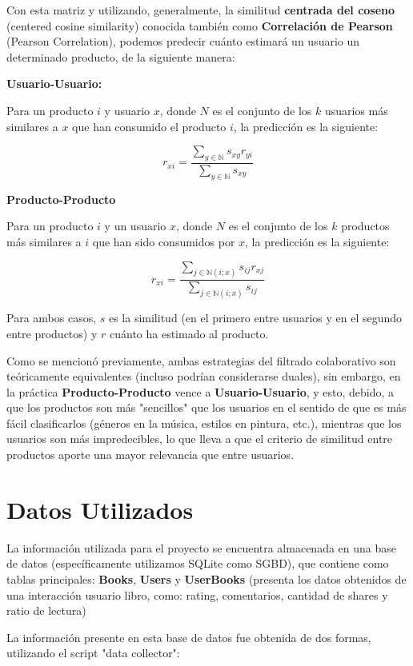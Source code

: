 \documentclass[14pt]{extarticle}
\begin{document}
Con esta matriz y utilizando, generalmente, la similitud \textbf{centrada del coseno} (centered cosine similarity) conocida también como \textbf{Correlación de Pearson} (Pearson Correlation), podemos predecir cuánto estimará un usuario un determinado producto, de la siguiente manera:

\textbf{Usuario-Usuario:}

Para un producto $i$ y usuario $x$, donde $N$ es el conjunto de los $k$ usuarios más similares a $x$ que han consumido el producto $i$, la predicción es la siguiente:

$$r_{xi} = \frac{\sum_{y \in \mathbb{N}} s_{xy} r_{yi}}{\sum_{y \in \mathbb{N}} s_{xy}}$$


\textbf{Producto-Producto}

Para un producto $i$ y un usuario $x$, donde $N$ es el conjunto de los $k$ productos más similares a $i$ que han sido consumidos por $x$, la predicción es la siguiente:

$$r_{xi} = \frac{\sum_{j \in \mathbb{N} (i; x)} s_{ij} r_{xj}}{\sum_{j \in \mathbb{N} (i;x)} s_{ij}}$$


Para ambos casos, $s$ es la similitud (en el primero entre usuarios y en el segundo entre productos) y $r$ cuánto ha estimado al producto.

Como se mencionó previamente, ambas estrategias del filtrado colaborativo son teóricamente equivalentes (incluso podrían considerarse duales), sin embargo, en la práctica \textbf{Producto-Producto} vence a \textbf{Usuario-Usuario}, y esto, debido, a que los productos son más "sencillos" que los usuarios en el sentido de que es más fácil clasificarlos (géneros en la música, estilos en pintura, etc.), mientras que los usuarios son más impredecibles, lo que lleva a que el criterio de similitud entre productos aporte una mayor relevancia que entre usuarios.

\section{Datos Utilizados}

La información utilizada para el proyecto se encuentra almacenada en una base de datos (específicamente utilizamos SQLite como SGBD), que contiene como tablas principales: \textbf{Books}, \textbf{Users} y \textbf{UserBooks} (presenta los datos obtenidos de una interacción usuario libro, como: rating, comentarios, cantidad de shares y ratio de lectura)

La información presente en esta base de datos fue obtenida de dos formas, utilizando el script "data collector":
\end{document}
